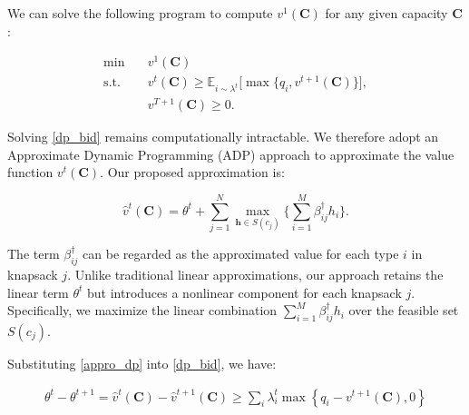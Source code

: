 We can solve the following program to compute $v^1(\bm{C})$ for any given capacity $\bm{C}$:

\begin{equation}\label{dp_bid}
    \begin{aligned}
    \min \quad & v^{1}(\bm{C}) \\
    \mathrm{s.t.} \quad & v^{t}(\bm{C}) \geq \mathbb{E}_{i \sim \lambda^t}\Bigg[\max\Big\{ q_{i}, v^{t+1}(\bm{C})\Big\}\Bigg], \\
    & v^{T+1}(\bm{C}) \geq 0.
    \end{aligned}
\end{equation}


Solving \eqref{dp_bid} remains computationally intractable. We therefore adopt an Approximate Dynamic Programming (ADP) approach \citep{adelman2007dynamic} to approximate the value function $v^{t}(\bm{C})$. Our proposed approximation is:

\begin{equation}\label{appro_dp}
    \hat{v}^{t}(\bm{C}) = \theta^{t} + \sum_{j=1}^{N} \max_{\bm{h} \in S(c_{j})} \{\sum_{i=1}^{M} \beta_{ij}^{\dag} h_{i}\}.
\end{equation}


The term $\beta_{ij}^{\dag}$ can be regarded as the approximated value for each type $i$ in knapsack $j$. Unlike traditional linear approximations, our approach retains the linear term $\theta^{t}$ but introduces a nonlinear component for each knapsack $j$. Specifically, we maximize the linear combination $\sum_{i=1}^{M} \beta_{ij}^{\dag} h_{i}$ over the feasible set $S(c_{j})$.




Substituting \eqref{appro_dp} into \eqref{dp_bid}, we have:

\begin{align}
    \theta^{t} - \theta^{t+1} = \hat{v}^{t}(\bm{C}) - \hat{v}^{t+1}(\bm{C}) \geq \sum_{i} \lambda_{i}^{t} \max\left\{q_{i} - v^{t+1}(\bm{C}), 0\right\}
\end{align}

